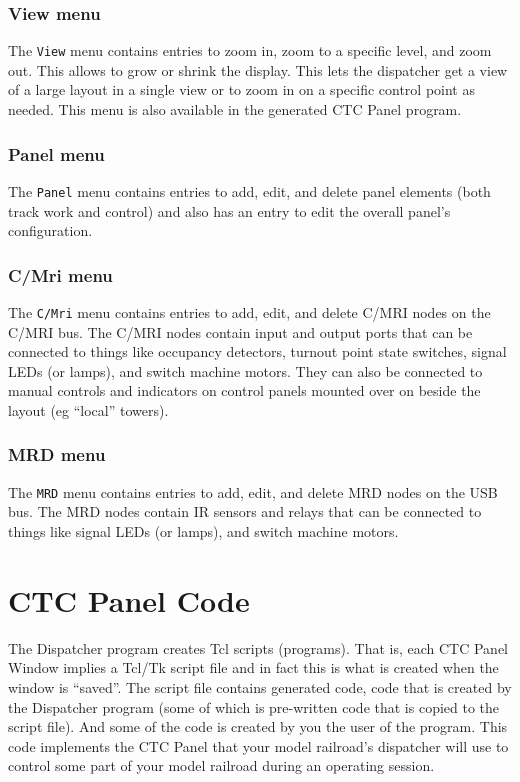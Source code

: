 \subsubsection{View menu}

The \verb=View= menu contains entries to zoom in, zoom to a specific
level, and zoom out. This allows to grow or shrink the display.  This
lets the dispatcher get a view of a large layout in a single view or to
zoom in on a specific control point as needed.  This menu is also
available in the generated CTC Panel program.

\subsubsection{Panel menu}

The \verb=Panel= menu contains entries to add, edit, and delete panel
elements (both track work and control) and also has an entry to edit the
overall panel's configuration. 

\subsubsection{C/Mri menu}

The \verb=C/Mri= menu contains entries to add, edit, and delete C/MRI
nodes on the C/MRI bus. The C/MRI nodes contain input and output ports
that can be connected to things like occupancy detectors, turnout point
state switches, signal LEDs (or lamps), and switch machine motors.  They
can also be connected to manual controls and indicators on control
panels mounted over on beside the layout (eg ``local'' towers).


\subsubsection{MRD menu}

The \verb=MRD= menu contains entries to add, edit, and delete MRD nodes
on the USB bus. The MRD nodes contain IR sensors and relays that can be
connected to things like signal LEDs (or lamps), and switch machine
motors.


\section{CTC Panel Code}

The Dispatcher program creates Tcl scripts (programs).  That is, each
CTC Panel Window implies a Tcl/Tk script file and in fact this is what
is created when the window is ``saved''.  The script file contains
generated code, code that is created by the Dispatcher program (some of
which is pre-written code that is copied to the script file). And some
of the code is created by you the user of the program. This code
implements the CTC Panel that your model railroad's dispatcher will use
to control some part of your model railroad during an operating session.

